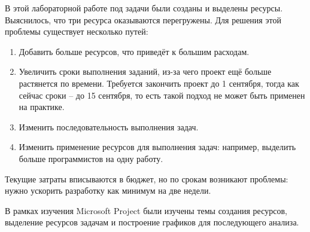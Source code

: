 В этой лабораторной работе под задачи были созданы и выделены ресурсы.
Выяснилось, что три ресурса оказываются перегружены.
Для решения этой проблемы существует несколько путей:
\begin{enumerate}
	\item Добавить больше ресурсов, что приведёт к большим расходам.
	\item Увеличить сроки выполнения заданий, из-за чего проект ещё больше растянется по времени. Требуется закончить проект до 1 сентября, тогда как сейчас сроки -- до 15 сентября, то есть такой подход не может быть применен на практике.
	\item Изменить последовательность выполнения задач.
	\item Изменить применение ресурсов для выполнения задач: например, выделить больше программистов на одну работу.
\end{enumerate}

Текущие затраты вписываются в бюджет, но по срокам возникают проблемы: нужно ускорить разработку как минимум на две недели.

В рамках изучения Microsoft Project были изучены темы создания ресурсов, выделение ресурсов задачам и построение графиков для последующего анализа.



